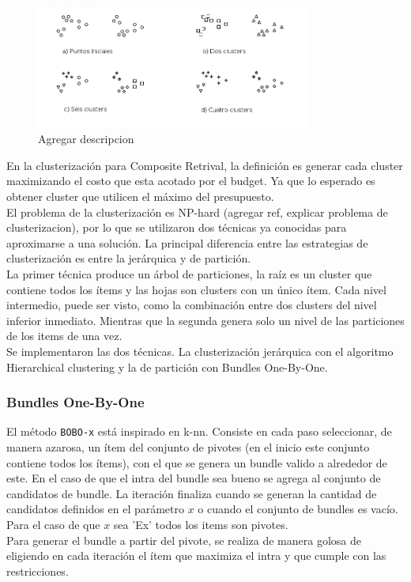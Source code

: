 \begin{figure}[H]
  \centering
    \includegraphics[width=0.8\textwidth]{img/howToCluster.png}
  \caption{Agregar descripcion}
  \label{res:img-howToCluster}
\end{figure}

En la clusterización para Composite Retrival, la definición es generar cada cluster maximizando el costo que esta acotado por el budget. Ya que lo esperado es obtener cluster que utilicen el máximo del presupuesto.\\
El problema de la clusterización es NP-hard (agregar ref, explicar problema de clusterizacion), por lo que se utilizaron dos técnicas ya conocidas para aproximarse a una solución. La principal diferencia entre las estrategias de clusterización es entre la jerárquica y de partición.\\
La primer técnica produce un árbol de particiones, la raíz es un cluster que contiene todos los ítems y las hojas son clusters con un único ítem. Cada nivel intermedio, puede ser visto, como la combinación entre dos clusters del nivel inferior inmediato. Mientras que la segunda genera solo un nivel de las particiones de los items de una vez.\\ 
Se implementaron las dos técnicas. La clusterización jerárquica con el algoritmo Hierarchical clustering y la de partición con Bundles One-By-One.\\

\subsubsection{Bundles One-By-One}
El método \texttt{BOBO-x} está inspirado en k-nn. Consiste en cada paso seleccionar, de manera azarosa, un ítem del conjunto de pivotes (en el inicio este conjunto contiene todos los ítems), con el que se genera un bundle valido a alrededor de este. En el caso de que el intra del bundle sea bueno se agrega al conjunto de candidatos de bundle. La iteración finaliza cuando se generan la cantidad de candidatos definidos en el parámetro $x$ o cuando el conjunto de bundles es vacío. Para el caso de que $x$ sea 'Ex' todos los items son pivotes.\\
Para generar el bundle a partir del pivote, se realiza de manera golosa de eligiendo en cada iteración el ítem que maximiza el intra y que cumple con las restricciones.\\

